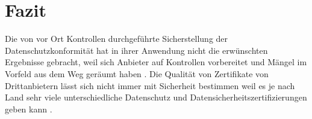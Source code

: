 \section{Fazit}
Die von vor Ort Kontrollen durchgeführte Sicherstellung der Datenschutzkonformität hat in ihrer Anwendung nicht die erwünschten Ergebnisse gebracht, weil sich Anbieter auf Kontrollen vorbereitet und Mängel im Vorfeld aus dem Weg geräumt haben \cite{selzer2020}.
Die Qualität von Zertifikate von Drittanbietern lässt sich nicht immer mit Sicherheit bestimmen weil es je nach Land sehr viele unterschiedliche Datenschutz und Datensicherheitszertifizierungen geben kann \cite{selzer2020}.


\cite{inproceedings}

\cite{article}

\cite{patent}

\cite{book}

\cite{electronic}